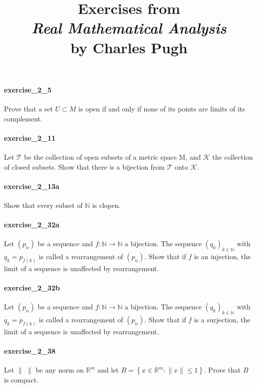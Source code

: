 \documentclass{article}
\title{\textbf{
Exercises from \\
\textit{Real Mathematical Analysis} \\
by Charles Pugh
}}
\date{}
\begin{document}
\maketitle

\paragraph{exercise\_2\_5} Prove that a set $U \subset M$ is open if and only if none of its points are limits of its complement.

\paragraph{exercise\_2\_11} Let $\mathcal{T}$ be the collection of open subsets of a metric space $\mathrm{M}$, and $\mathcal{K}$ the collection of closed subsets. Show that there is a bijection from $\mathcal{T}$ onto $\mathcal{K}$.

\paragraph{exercise\_2\_13a} Show that every subset of $\mathbb{N}$ is clopen.

\paragraph{exercise\_2\_32a} Let $(p_n)$ be a sequence and $f:\mathbb{N}\to\mathbb{N}$ a bijection. The sequence $(q_k)_{k\in\mathbb{N}}$ with $q_k=p_{f(k)}$ is called a rearrangement of $(p_n)$. Show that if $f$ is an injection, the limit of a sequence is unaffected by rearrangement.

\paragraph{exercise\_2\_32b} Let $(p_n)$ be a sequence and $f:\mathbb{N}\to\mathbb{N}$ a bijection. The sequence $(q_k)_{k\in\mathbb{N}}$ with $q_k=p_{f(k)}$ is called a rearrangement of $(p_n)$. Show that if $f$ is a surjection, the limit of a sequence is unaffected by rearrangement.

\paragraph{exercise\_2\_38} Let $\|\hspace{4pt}\|$ be any norm on $\mathbb{R}^{m}$ and let $B=\left\{x \in \mathbb{R}^{m}:\|x\| \leq 1\right\}$. Prove that $B$ is compact.
\end{document}
